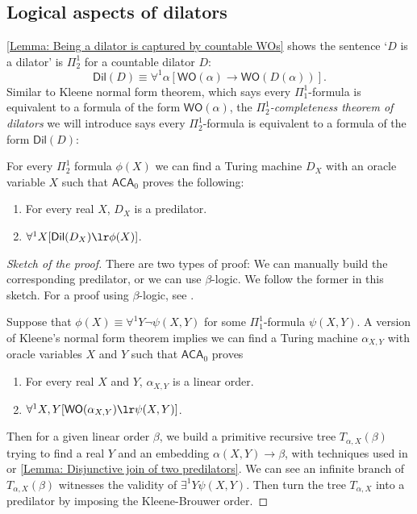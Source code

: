 \documentclass{mhkr}
\newcommand{\added}[1]{#1}
\newcommand{\WO}{\mathsf{WO}}
\newcommand{\Dil}{\mathsf{Dil}}
\newcommand{\ACA}{\mathsf{ACA}}
\begin{document}
\subsection{Logical aspects of dilators}
\autoref{Lemma: Being a dilator is captured by countable WOs} shows the sentence `$D$ is a dilator' is $\Pi^1_2$ for a countable dilator $D$:
\begin{equation*}
    \Dil(D) \equiv \forall^1 \alpha [\WO(\alpha)\to \WO(D(\alpha))].
\end{equation*}
Similar to Kleene normal form theorem, which says every $\Pi^1_1$-formula is equivalent to a formula of the form $\WO(\alpha)$, the \emph{$\Pi^1_2$-completeness theorem of dilators} we will introduce says every $\Pi^1_2$-formula is equivalent to a formula of the form $\Dil(D)$:
\begin{theorem} \pushQED{\qed}
    For every $\Pi^1_2$ formula $\phi(X)$ we can find a Turing machine $D_X$ with an oracle variable $X$ such that $\ACA_0$ proves the following:
    \begin{enumerate}
        \item For every real $X$, $D_X$ is a predilator.
        \item $\forall^1 X [\Dil(D_X) \lr \phi(X)]$.
    \end{enumerate}
\end{theorem}\added{
\begin{proof}[Sketch of the proof]
    There are two types of proof: We can manually build the corresponding predilator, or we can use $\beta$-logic. We follow the former in this sketch. For a proof using $\beta$-logic, see \cite[Lemma 7]{AguileraPakhomov2024Nonlinearity}. 

    Suppose that $\phi(X) \equiv \forall^1 Y \lnot \psi(X,Y)$ for some $\Pi^1_1$-formula $\psi(X,Y)$. A version of Kleene's normal form theorem implies we can find a Turing machine $\alpha_{X,Y}$ with oracle variables $X$ and $Y$ such that $\ACA_0$ proves
    \begin{enumerate}
        \item For every real $X$ and $Y$, $\alpha_{X,Y}$ is a linear order.
        \item $\forall^1 X,Y [\WO(\alpha_{X,Y})\lr \psi(X,Y)]$.
    \end{enumerate}
    Then for a given linear order $\beta$, we build a primitive recursive tree $T_{\alpha,X}(\beta)$ trying to find a real $Y$ and an embedding $\alpha(X,Y)\to \beta$, with techniques used in \cite[Lemma 8]{AguileraPakhomov2023Pi12} or \autoref{Lemma: Disjunctive join of two predilators}.
    We can see an infinite branch of $T_{\alpha,X}(\beta)$ witnesses the validity of $\exists^1 Y \psi(X,Y)$.
    Then turn the tree $T_{\alpha,X}$ into a predilator by imposing the Kleene-Brouwer order.
\end{proof}
}
\end{document}
